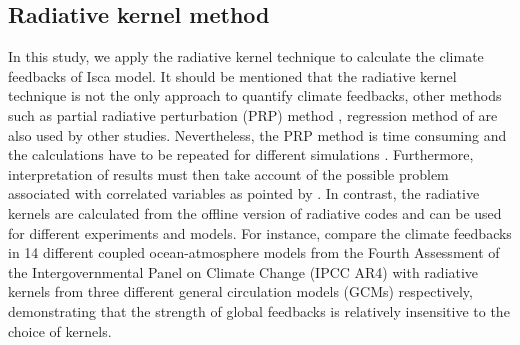 \subsection{Radiative kernel method}
\label{sec:rad_kernel_method_for_pa}

In this study, we apply the radiative kernel  technique \citep{Soden2008,Shell2008} to calculate the climate feedbacks of Isca model. It should be mentioned that the radiative kernel technique is not the only approach to quantify climate feedbacks, other methods such as partial radiative perturbation (PRP) method \citep{Wetherald1988cloud}, regression method of \cite{Gregory2004} are also used by other studies. Nevertheless, the PRP method is time consuming and the calculations have to be repeated for different simulations \citep{Shell2008}. Furthermore, interpretation of results must then take account of the possible problem associated with correlated variables as pointed by \cite{Bony2006}. In contrast, the radiative kernels are calculated from the offline version of radiative codes and can be used for different experiments and models. For instance, \cite{Soden2008} compare the climate feedbacks in 14 different coupled ocean-atmosphere models from the Fourth Assessment of the Intergovernmental Panel on Climate Change (IPCC AR4) with radiative kernels from three different general circulation models (GCMs) respectively, demonstrating that the strength of global feedbacks is relatively insensitive to the choice of kernels.


